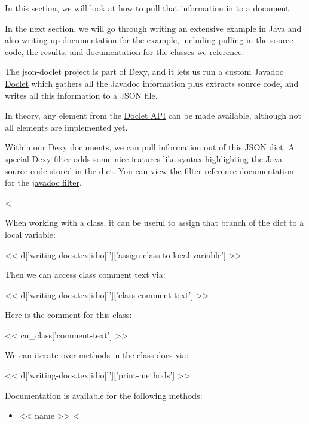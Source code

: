 In this section, we will look at how to pull that information in to a document.

In the next section, we will go through writing an extensive example in Java
and also writing up documentation for the example, including pulling in the
source code, the results, and documentation for the classes we reference.

The json-doclet project is part of Dexy, and it lets us run a custom Javadoc
\href{http://download.oracle.com/javase/6/docs/technotes/guides/javadoc/doclet/overview.html}{Doclet}
which gathers all the Javadoc information plus extracts source code, and
writes all this information to a JSON file.

In theory, any element from the \href{http://download.oracle.com/javase/6/docs/jdk/api/javadoc/doclet/index.html}{Doclet API}
can be made available, although not all elements are implemented yet.

Within our Dexy documents, we can pull information out of this JSON dict. A
special Dexy filter adds some nice features like syntax highlighting the Java
source code stored in the dict. You can view the filter reference documentation
for the \href{http://dexy.it/docs/filters/javadoc}{javadoc filter}.

<%

When working with a class, it can be useful to assign that branch of the dict to a local variable:

<< d['writing-docs.tex|idio|l']['assign-class-to-local-variable'] >>

Then we can access class comment text via:

<< d['writing-docs.tex|idio|l']['class-comment-text'] >>

Here is the comment for this class:

<< cn_class['comment-text'] >>

We can iterate over methods in the class docs via:

<< d['writing-docs.tex|idio|l']['print-methods'] >>

Documentation is available for the following methods:

\begin{itemize}
<%
\item{<< name >>}
<%
\end{itemize}

